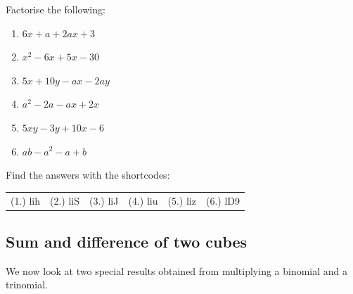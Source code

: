 


\begin{exercises}{}{
\nopagebreak
Factorise the following:
\begin{multicols}{2}
\begin{enumerate}[itemsep=5pt, label=\textbf{\arabic*}. ] 
\item $6x+a+2ax+3$
\item ${x}^{2}-6x+5x-30$
\item $5x+10y-ax-2ay$
\item ${a}^{2}-2a-ax+2x$
\item $5xy-3y+10x-6$
\item $ab - a^{2} - a + b$
\end{enumerate}
\end{multicols}
\practiceinfo 
\par {} Find the answers with the shortcodes:
\par \begin{tabular}[h]{cccccc}
(1.) lih  &  (2.) liS  &  (3.) liJ  &  (4.) liu  &  (5.) liz  & (6.) lD9 \end{tabular}
}
\end{exercises}


\subsection*{Sum and difference of two cubes}      
We now look at two special results obtained from multiplying a binomial and a trinomial. 

